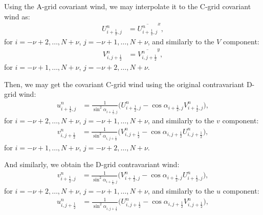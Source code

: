Using the A-grid covariant wind, we may interpolate it to the C-grid covariant wind as:
\begin{align}
	\label{d2a-uu}
	U_{i+\frac{1}{2},j}^n &= \overline{U_{i+\frac{1}{2},j}^n}^x,
\end{align}
for $i=-\nu+2,\ldots,N+\nu$, $j=-\nu+1,\ldots,N+\nu$, and similarly to the $V$ component:
\begin{align}
	\label{d2a-vv}
	V_{i,j+\frac{1}{2}}^n &= \overline{V_{i,j+\frac{1}{2}}^n}^y,
\end{align}
for $i=-\nu+1,\ldots,N+\nu$, $j=-\nu+2,\ldots,N+\nu$.

Then, we may get the covariant C-grid wind using the original contravariant D-grid wind:
\begin{align}
	\label{d2a-uuu}
	u_{i+\frac{1}{2},j}^n &= \frac{1}{\sin^2{\alpha_{i+\frac{1}{2},j}}}
	\bigg({U_{i+\frac{1}{2},j}^n} - \cos{\alpha_{i+\frac{1}{2},j}} {V_{i+\frac{1}{2},j}^n}\bigg),
\end{align}
for $i=-\nu+2,\ldots,N+\nu$, $j=-\nu+1,\ldots,N+\nu$, and similarly to the $v$ component:
\begin{align}
	\label{d2a-vvv}
	v_{i,j+\frac{1}{2}}^n &= \frac{1}{\sin^2{\alpha_{i,j+\frac{1}{2}}}}
	\bigg({V_{i,j+\frac{1}{2}}^n} - \cos{\alpha_{i,j+\frac{1}{2}}}{U_{i,j+\frac{1}{2}}^n}\bigg),
\end{align}
for $i=-\nu+1,\ldots,N+\nu$, $j=-\nu+2,\ldots,N+\nu$.

And similarly, we obtain the D-grid contravariant wind:
\begin{align}
	\label{d2a-uuuu}
	v_{i+\frac{1}{2},j}^n &= \frac{1}{\sin^2{\alpha_{i+\frac{1}{2},j}}}
	\bigg({V_{i+\frac{1}{2},j}^n} - \cos{\alpha_{i+\frac{1}{2},j}} {U_{i+\frac{1}{2},j}^n}\bigg),
\end{align}
for $i=-\nu+2,\ldots,N+\nu$, $j=-\nu+1,\ldots,N+\nu$, and similarly to the $u$ component:
\begin{align}
	\label{d2a-vvvv}
	u_{i,j+\frac{1}{2}}^n &= \frac{1}{\sin^2{\alpha_{i,j+\frac{1}{2}}}}
	\bigg({U_{i,j+\frac{1}{2}}^n} - \cos{\alpha_{i,j+\frac{1}{2}}}{V_{i,j+\frac{1}{2}}^n}\bigg),
\end{align}

